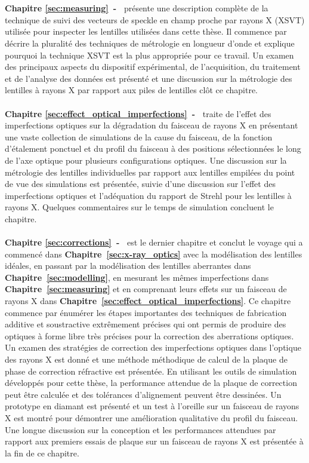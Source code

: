 \\
\\
\textbf{Chapitre \ref{sec:measuring}~-~} présente une description complète de la technique de suivi des vecteurs de speckle en champ proche par rayons X (XSVT) utilisée pour inspecter les lentilles utilisées dans cette thèse. Il commence par décrire la pluralité des techniques de métrologie en longueur d'onde et explique pourquoi la technique XSVT est la plus appropriée pour ce travail. Un examen des principaux aspects du dispositif expérimental, de l'acquisition, du traitement et de l'analyse des données est présenté et une discussion sur la métrologie des lentilles à rayons X par rapport aux piles de lentilles clôt ce chapitre.
\\
\\
\textbf{Chapitre \ref{sec:effect_optical_imperfections}~-~} traite de l'effet des imperfections optiques sur la dégradation du faisceau de rayons X en présentant une vaste collection de simulations de la cause du faisceau, de la fonction d'étalement ponctuel et du profil du faisceau à des positions sélectionnées le long de l'axe optique pour plusieurs configurations optiques. Une discussion sur la métrologie des lentilles individuelles par rapport aux lentilles empilées du point de vue des simulations est présentée, suivie d'une discussion sur l'effet des imperfections optiques et l'adéquation du rapport de Strehl pour les lentilles à rayons X. Quelques commentaires sur le temps de simulation concluent le chapitre.
\\
\\
\textbf{Chapitre \ref{sec:corrections}~-~} est le dernier chapitre et conclut le voyage qui a commencé dans \textbf{Chapitre~\ref{sec:x-ray_optics}} avec la modélisation des lentilles idéales, en passant par la modélisation des lentilles aberrantes dans \textbf{Chapitre~\ref{sec:modelling}}, en mesurant les mêmes imperfections dans \textbf{Chapitre~\ref{sec:measuring}} et en comprenant leurs effets sur un faisceau de rayons X dans \textbf{Chapitre~\ref{sec:effect_optical_imperfections}}. Ce chapitre commence par énumérer les étapes importantes des techniques de fabrication additive et soustractive extrêmement précises qui ont permis de produire des optiques à forme libre très précises pour la correction des aberrations optiques. Un examen des stratégies de correction des imperfections optiques dans l'optique des rayons X est donné et une méthode méthodique de calcul de la plaque de phase de correction réfractive est présentée. En utilisant les outils de simulation développés pour cette thèse, la performance attendue de la plaque de correction peut être calculée et des tolérances d'alignement peuvent être dessinées. Un prototype en diamant est présenté et un test à l'oreille sur un faisceau de rayons X est montré pour démontrer une amélioration qualitative du profil du faisceau. Une longue discussion sur la conception et les performances attendues par rapport aux premiers essais de plaque sur un faisceau de rayons X est présentée à la fin de ce chapitre.
